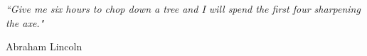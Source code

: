 \documentclass[11pt, a4paper, oneside]{Thesis} %
\begin{document}
\clearpage %


\pagestyle{empty} %

\null\vfill %

\textit{``Give me six hours to chop down a tree and I will spend the first four sharpening the axe."}

\begin{flushright}
Abraham Lincoln
\end{flushright}

\vfill\vfill\vfill\vfill\vfill\vfill\null %

\clearpage %


\end{document}

